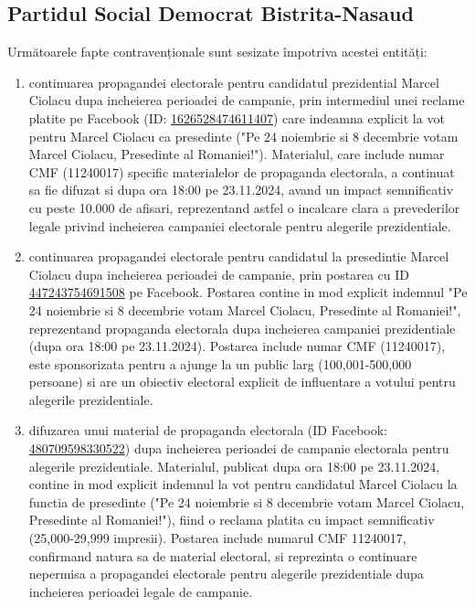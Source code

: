 \documentclass[a4paper,12pt]{article}
\begin{document}
\vspace{0.5cm}

\subsection{Partidul Social Democrat Bistrita-Nasaud}
Următoarele fapte contravenționale sunt sesizate împotriva acestei entități:

\begin{enumerate}[leftmargin=*, label=\arabic*.)]
    \item continuarea propagandei electorale pentru candidatul prezidential Marcel Ciolacu dupa incheierea perioadei de campanie, prin intermediul unei reclame platite pe Facebook (ID: \href{https://www.facebook.com/ads/library/?id=1626528474611407}{1626528474611407}) care indeamna explicit la vot pentru Marcel Ciolacu ca presedinte ("Pe 24 noiembrie si 8 decembrie votam  Marcel Ciolacu, Presedinte al Romaniei!"). Materialul, care include numar CMF (11240017) specific materialelor de propaganda electorala, a continuat sa fie difuzat si dupa ora 18:00 pe 23.11.2024, avand un impact semnificativ cu peste 10.000 de afisari, reprezentand astfel o incalcare clara a prevederilor legale privind incheierea campaniei electorale pentru alegerile prezidentiale.
    \item continuarea propagandei electorale pentru candidatul la presedintie Marcel Ciolacu dupa incheierea perioadei de campanie, prin postarea cu ID \href{https://www.facebook.com/ads/library/?id=447243754691508}{447243754691508} pe Facebook. Postarea contine in mod explicit indemnul "Pe 24 noiembrie si 8 decembrie votam  Marcel Ciolacu, Presedinte al Romaniei!", reprezentand propaganda electorala dupa incheierea campaniei prezidentiale (dupa ora 18:00 pe 23.11.2024). Postarea include numar CMF (11240017), este sponsorizata pentru a ajunge la un public larg (100,001-500,000 persoane) si are un obiectiv electoral explicit de influentare a votului pentru alegerile prezidentiale.
    \item difuzarea unui material de propaganda electorala (ID Facebook: \href{https://www.facebook.com/ads/library/?id=480709598330522}{480709598330522}) dupa incheierea perioadei de campanie electorala pentru alegerile prezidentiale. Materialul, publicat dupa ora 18:00 pe 23.11.2024, contine in mod explicit indemnul la vot pentru candidatul Marcel Ciolacu la functia de presedinte ("Pe 24 noiembrie si 8 decembrie votam  Marcel Ciolacu, Presedinte al Romaniei!"), fiind o reclama platita cu impact semnificativ (25,000-29,999 impresii). Postarea include numarul CMF 11240017, confirmand natura sa de material electoral, si reprezinta o continuare nepermisa a propagandei electorale pentru alegerile prezidentiale dupa incheierea perioadei legale de campanie.
\end{enumerate}
\end{document}
